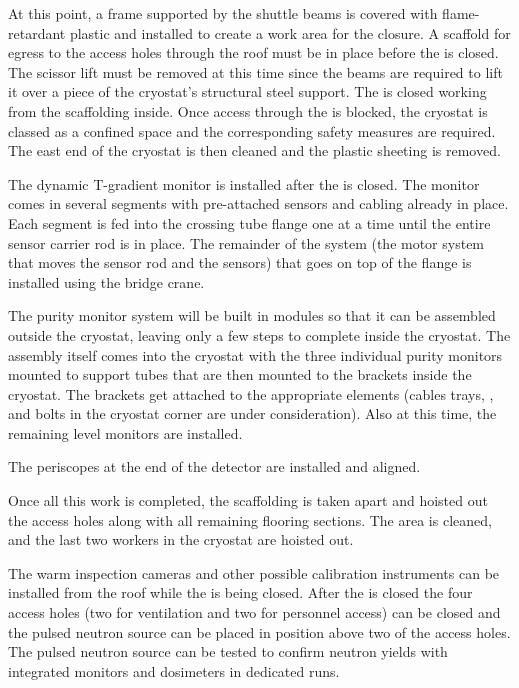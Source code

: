 At this point, a frame supported by the shuttle beams is covered with flame-retardant plastic and installed to create a work area for the  closure.  
A scaffold  for egress to the access holes through the roof  must be in place before the  is closed. %
The scissor lift must be removed at this time since the  beams are required to lift it over a piece of the cryostat's structural steel support. 
The  is closed working from the scaffolding inside. 
Once access through the  is blocked, the cryostat is classed as a confined space and the corresponding safety measures are required.
The east end of the cryostat is then cleaned and the plastic sheeting is removed. 

The dynamic T-gradient monitor is installed after the  is closed. 
The monitor comes in several segments with pre-attached sensors and cabling already in place. Each segment is fed into the crossing tube flange one at a time until the entire sensor carrier rod is in place. 
The remainder of the system (the motor system that moves the sensor rod and the sensors) that goes on top of the flange is installed using the bridge crane. 

The purity monitor system will be built in modules so that it can be assembled outside the cryostat, leaving only a few steps to complete inside the cryostat. 
The assembly itself comes into the cryostat with the three individual purity monitors mounted to support tubes that are then mounted to the brackets inside the cryostat. The brackets get attached to the appropriate elements (cables trays, , and bolts in the cryostat corner are under consideration). Also at this time, the remaining level monitors are installed.

The periscopes at the end of the detector are installed and aligned. 

Once all this work is completed, the scaffolding is taken apart and hoisted out the access holes along with all remaining flooring sections. The area is cleaned, and the last two workers in the cryostat are hoisted out. 

The warm inspection cameras and other possible calibration instruments can be installed from the roof while the  is being closed. 
After the  is closed the four access holes (two for ventilation and two for personnel access)  can be closed and the pulsed neutron source can be placed in position above two of the access holes. The pulsed neutron source can be tested to confirm neutron yields with integrated monitors and dosimeters in dedicated runs.


